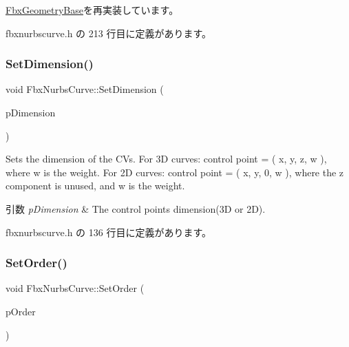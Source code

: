 \hyperlink{class_fbx_geometry_base_ab2d5567b073e6b9f4feb5bb428fa99e4}{Fbx\+Geometry\+Base}を再実装しています。



 fbxnurbscurve.\+h の 213 行目に定義があります。

\mbox{\label{class_fbx_nurbs_curve_a97134fe64a13da3a87879adf8a6c69c5}} 
\subsubsection{\texorpdfstring{Set\+Dimension()}{SetDimension()}}
{\footnotesize\ttfamily void Fbx\+Nurbs\+Curve\+::\+Set\+Dimension (\begin{DoxyParamCaption}\item[{\hyperlink{class_fbx_nurbs_curve_a95d4a63cff6dd62901ea39c268336122}{E\+Dimension}}]{p\+Dimension }\end{DoxyParamCaption})\hspace{0.3cm}{\ttfamily [inline]}}

Sets the dimension of the C\+Vs. For 3D curves\+: control point = ( x, y, z, w ), where w is the weight. For 2D curves\+: control point = ( x, y, 0, w ), where the z component is unused, and w is the weight. 
\begin{DoxyParams}{引数}
{\em p\+Dimension} & The control points dimension(3\+D or 2\+D). \\
\hline
\end{DoxyParams}


 fbxnurbscurve.\+h の 136 行目に定義があります。

\mbox{\label{class_fbx_nurbs_curve_a86494a5ca4d88af6700d0d1345852736}} 
\subsubsection{\texorpdfstring{Set\+Order()}{SetOrder()}}
{\footnotesize\ttfamily void Fbx\+Nurbs\+Curve\+::\+Set\+Order (\begin{DoxyParamCaption}\item[{int}]{p\+Order }\end{DoxyParamCaption})\hspace{0.3cm}{\ttfamily [inline]}}

